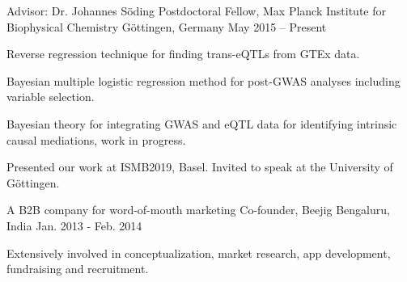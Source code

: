 


\begin{cventries}


\cventry
{Advisor: Dr. Johannes S{\"o}ding} %
{Postdoctoral Fellow, Max Planck Institute for Biophysical Chemistry} %
{G{\"o}ttingen, Germany} %
{May 2015 -- Present} %
{ %
\begin{cvitems}
\item {Reverse regression technique for finding trans-eQTLs from GTEx data.}
\item {Bayesian multiple logistic regression method for post-GWAS analyses including variable selection.}
\item {Bayesian theory for integrating GWAS and eQTL data for identifying intrinsic causal mediations, work in progress.}
\item {Presented our work at ISMB2019, Basel. Invited to speak at the University of G{\"o}ttingen.}
\end{cvitems}
}


\cventry
{A B2B company for word-of-mouth marketing} %
{Co-founder, Beejig} %
{Bengaluru, India} %
{Jan. 2013 - Feb. 2014} %
{ %
\begin{cvitems}
\item {Extensively involved in conceptualization, market research, app development, fundraising and recruitment.}
\end{cvitems}
}


\end{cventries}
